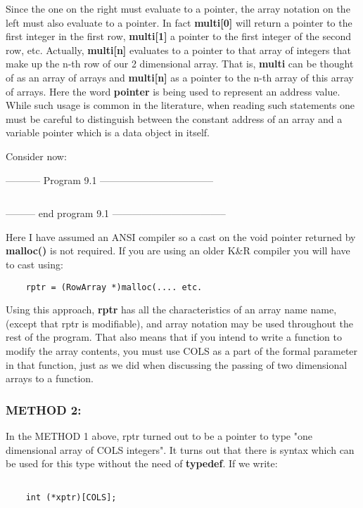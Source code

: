 Since the one on the right must evaluate to a pointer, the array
notation on the left must also evaluate to a pointer. In fact
\textbf{multi{[}0{]}} will return a pointer to the first integer in the
first row, \textbf{multi{[}1{]}} a pointer to the first integer of the
second row, etc. Actually, \textbf{multi{[}n{]}} evaluates to a pointer
to that array of integers that make up the n-th row of our 2 dimensional
array. That is, \textbf{multi} can be thought of as an array of arrays
and \textbf{multi{[}n{]}} as a pointer to the n-th array of this array
of arrays. Here the word \textbf{pointer} is being used to represent an
address value. While such usage is common in the literature, when
reading such statements one must be careful to distinguish between the
constant address of an array and a variable pointer which is a data
object in itself.

Consider now:

-----------  Program 9.1  -----------------------------------
\inputminted{c}{../src/ch9-1.c}
--------- end program 9.1 -----------------------------------

Here I have assumed an ANSI compiler so a cast on the void pointer
returned by \textbf{malloc()} is not required. If you are using an older
K\&R compiler you will have to cast using:

\begin{verbatim}
    rptr = (RowArray *)malloc(.... etc.
\end{verbatim}

Using this approach, \textbf{rptr} has all the characteristics of an
array name name, (except that rptr is modifiable), and array notation
may be used throughout the rest of the program. That also means that if
you intend to write a function to modify the array contents, you must
use COLS as a part of the formal parameter in that function, just as we
did when discussing the passing of two dimensional arrays to a function.

\hypertarget{method-2}{%
\subsubsection{METHOD 2:}\label{method-2}}

In the METHOD 1 above, rptr turned out to be a pointer to type "one
dimensional array of COLS integers". It turns out that there is syntax
which can be used for this type without the need of \textbf{typedef}. If
we write:

\begin{verbatim}

    int (*xptr)[COLS];
\end{verbatim}

